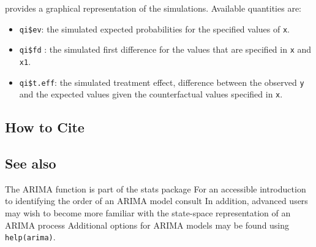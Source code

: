 \begin{itemize}
  provides a graphical representation of the simulations.  Available
  quantities are:
\begin{itemize}
\item {\tt qi\$ev}: the simulated expected probabilities for the
  specified values of {\tt x}.  
\item {\tt qi\$fd} : the simulated first difference for the values
  that are specified in {\tt x} and {\tt x1}.
\item{ \tt qi\$t.eff}: the simulated treatment effect, difference
between the observed {\tt y} and the expected values given the
counterfactual values specified in {\tt x}.     
\end{itemize}  
\end{itemize}


\subsection* {How to Cite} 




\subsection* {See also}

The ARIMA function is part of the stats package \citep{VenRip02}
For an accessible introduction to identifying the order of an ARIMA
model consult \cite{Enders04}
In addition, advanced users may wish to become more familiar with the state-space representation of an ARIMA process \citep{BroDav91}
Additional options for ARIMA models may be found using {\tt
help(arima)}.  




  



